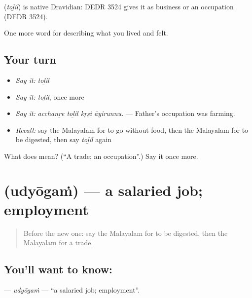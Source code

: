 \begin{cousinweb}
\textbf{} (\emph{toḻil}) is native Dravidian: DEDR 3524 gives it as business or an occupation (DEDR 3524).
\end{cousinweb}

\begin{grammarlens}[title={What you've built}]
One more word for describing what you lived and felt.
\end{grammarlens}

\subsection*{Your turn}
\begin{itemize}
\raggedright
  \item \emph{Say it:} \emph{toḻil}
  \item \emph{Say it:} \emph{toḻil}, once more
  \item \emph{Say it:} \emph{acchanṟe toḻil kṛṣi āyirunnu.} — Father's occupation was farming.
  \item \emph{Recall:} say the Malayalam for to go without food, then the Malayalam for to be digested, then say \emph{toḻil} again
\end{itemize}

\begin{tcolorbox}[breakable,colback=teal!4,colframe=teal!35!black,title={Before you move on}]
What does  mean? (\textquotedblleft{}A trade; an occupation\textquotedblright{}.) Say it once more.
\end{tcolorbox}
\section[\texorpdfstring{\ml{ഉദ്യോഗം} (udyōgaṁ)}{ഉദ്യോഗം (udyōgaṁ)}]{ (udyōgaṁ) — a salaried job; employment}

\label{lesson:ML-C542-udyogam}



\begin{quote}
Before the new one: say the Malayalam for to be digested, then the Malayalam for a trade.
\end{quote}

\subsection*{You'll want to know: }
\textbf{} — \emph{udyōgaṁ} — \textquotedblleft{}a salaried job; employment\textquotedblright{}.

